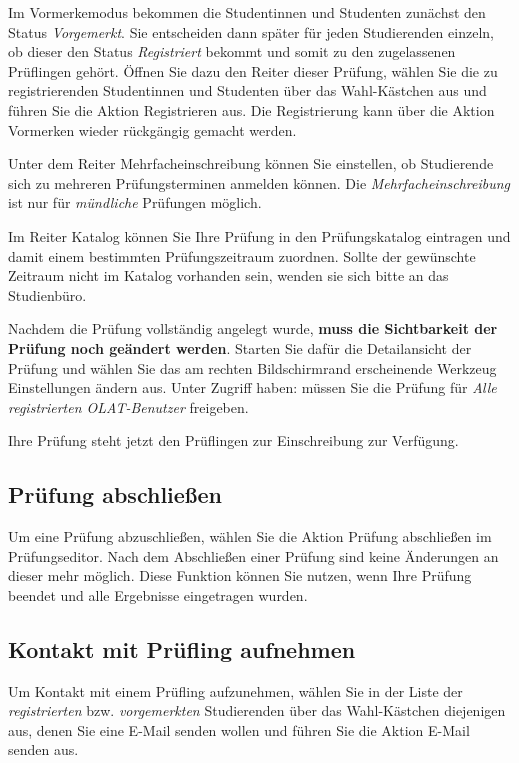 \documentclass[a4paper,11pt]{article}
\newcommand{\knopf}[1]{{\sc #1}}
\begin{document}
Im Vormerkemodus bekommen die Studentinnen und Studenten zunächst den Status {\em Vorgemerkt}. Sie entscheiden dann später für jeden Studierenden einzeln,
ob dieser den Status {\em Registriert} bekommt und somit zu den zugelassenen Prüflingen gehört.
Öffnen Sie dazu den Reiter dieser Prüfung, wählen Sie die zu registrierenden
Studentinnen und Studenten über das Wahl-Kästchen aus und führen
Sie die Aktion \knopf{Registrieren} aus. Die Registrierung kann über die Aktion \knopf{Vormerken} wieder rückgängig gemacht werden.

Unter dem Reiter \knopf{Mehrfacheinschreibung} können Sie einstellen, ob Studierende sich zu mehreren Prüfungsterminen anmelden können. Die {\em Mehrfacheinschreibung} ist nur für {\em mündliche} Prüfungen möglich.

Im Reiter \knopf{Katalog} können Sie Ihre Prüfung in den Prüfungskatalog
eintragen und damit einem bestimmten Prüfungszeitraum zuordnen. Sollte der
gewünschte Zeitraum nicht im Katalog vorhanden sein, wenden sie sich bitte an
das Studienbüro.

Nachdem die Prüfung vollständig angelegt wurde, {\bf muss die Sichtbarkeit der
  Prüfung noch geändert werden}. Starten Sie dafür die \knopf{Detailansicht}
der Prüfung und wählen Sie das am rechten Bildschirmrand erscheinende Werkzeug
\knopf{Einstellungen ändern} aus. Unter \knopf{Zugriff haben:} müssen Sie die
Prüfung für {\em Alle registrierten OLAT-Benutzer} freigeben.  

Ihre Prüfung steht jetzt den Prüflingen zur Einschreibung zur Verfügung.

\subsection{Prüfung abschließen}

Um eine Prüfung abzuschließen, wählen Sie die Aktion \knopf{Prüfung abschließen} im Prüfungseditor. Nach dem Abschließen einer Prüfung sind keine Änderungen an dieser mehr möglich. Diese Funktion können Sie nutzen, wenn Ihre Prüfung beendet und alle Ergebnisse eingetragen wurden.

\subsection{Kontakt mit Prüfling aufnehmen}

Um Kontakt mit einem Prüfling aufzunehmen, wählen Sie in der Liste der {\em registrierten} bzw. {\em vorgemerkten} Studierenden über das Wahl-Kästchen diejenigen aus, denen Sie eine E-Mail senden wollen und führen Sie die Aktion \knopf{E-Mail senden} aus.
\end{document}
